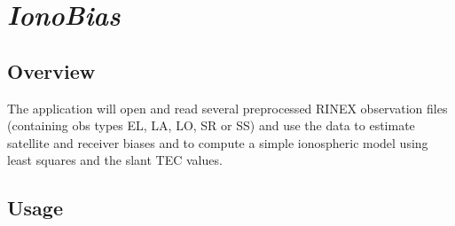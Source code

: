 %
%


\section{\emph{IonoBias}}
\subsection{Overview}
The application will open and read several preprocessed RINEX observation files (containing obs types EL, LA, LO, SR or SS) and use the data to estimate satellite and receiver biases and to compute a simple ionospheric model using least squares and the slant TEC values.

\subsection{Usage}
